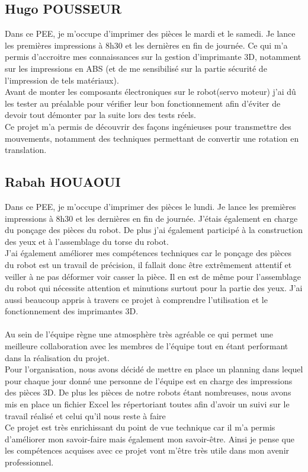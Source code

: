 \documentclass[11pt, oneside]{article}
\begin{document}
\subsection{Hugo POUSSEUR}

\vspace{0.5cm}

Dans ce PEE, je m'occupe d'imprimer des pièces le mardi et le samedi. Je lance les premières impressions à 8h30 et les dernières en fin de journée.  Ce qui m'a permis d'accroitre mes connaissances sur la gestion d'imprimante 3D, notamment sur les impressions en ABS (et de me sensibilisé sur la partie sécurité de l'impression de tels matériaux).\\ 
Avant de monter les composants électroniques sur le robot(servo moteur) j'ai dû les tester au préalable pour vérifier leur bon fonctionnement afin d'éviter de devoir tout démonter par la suite lors des tests réels.\\
 Ce projet m'a permis de découvrir des façons ingénieuses pour transmettre des mouvements, notamment des techniques permettant de convertir une rotation en translation.


\subsection{Rabah HOUAOUI}
\vspace{0.5cm}

Dans ce PEE, je m'occupe d'imprimer des pièces le lundi. Je lance les premières impressions à 8h30 et les dernières en fin de journée. J'étais également en charge du ponçage des pièces du robot. De plus j'ai également participé à la construction des yeux et à l'assemblage du torse du robot.  \\
J'ai également améliorer mes compétences techniques car le ponçage des pièces du robot est un travail de précision, il fallait donc être extrêmement attentif et veiller à ne pas déformer voir casser la pièce. Il en est de même pour l'assemblage du robot qui nécessite attention et minutions surtout pour la partie des yeux. J'ai aussi beaucoup appris à travers ce projet à comprendre l'utilisation et le fonctionnement des imprimantes 3D. 
\paragraph{} Au sein de l'équipe règne une atmosphère très agréable ce qui permet une meilleure collaboration avec les membres de l'équipe tout en étant performant dans la réalisation du projet. \\
Pour l'organisation, nous avons décidé de mettre en place un planning dans lequel pour chaque jour donné une personne de l'équipe est en charge des impressions des pièces 3D. De plus les pièces de notre robots étant nombreuses, nous avons mis en place un fichier Excel les répertoriant toutes afin d'avoir un suivi sur le travail réalisé et celui qu'il nous reste à faire \\
Ce projet est très enrichissant du point de vue technique car il m'a permis d'améliorer mon savoir-faire mais également mon savoir-être. Ainsi je pense que les compétences acquises avec ce projet vont m'être très utile dans mon avenir professionnel. 
\end{document}
